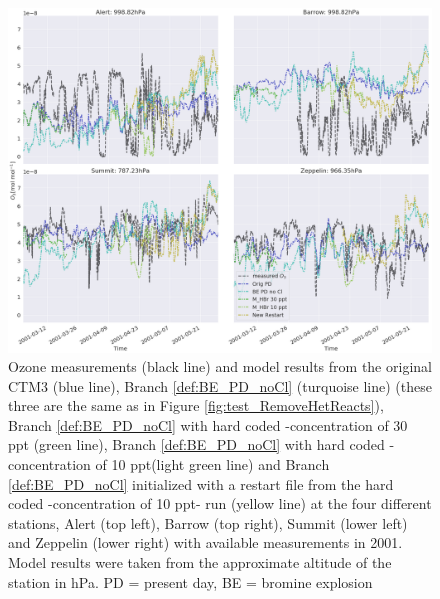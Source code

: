 \begin{figure}[ht]
    \centering
    \includegraphics[width=\linewidth]{Chapter6_Results/images/ozone_noCl_step2.png}
    \caption{Ozone measurements (black line) and model results from the original CTM3 (blue line), Branch \ref{def:BE_PD_noCl} (turquoise line) (these three are the same as in Figure \ref{fig:test_RemoveHetReacts}), Branch \ref{def:BE_PD_noCl} with hard coded -concentration of 30 ppt (green line), Branch \ref{def:BE_PD_noCl} with hard coded -concentration of 10 ppt(light green line) and Branch \ref{def:BE_PD_noCl} initialized with a restart file from the hard coded -concentration of 10 ppt- run (yellow line) at the four different stations, Alert (top left), Barrow (top right), Summit (lower left) and Zeppelin (lower right) with available measurements in 2001. Model results were taken from the approximate altitude of the station in hPa. PD = present day, BE = bromine explosion}
    \label{fig:ozone_noCl_step2}
\end{figure}